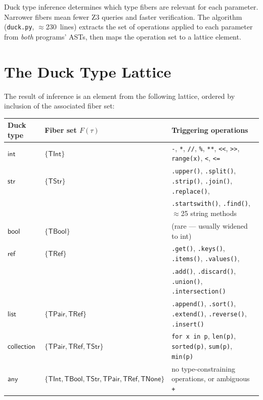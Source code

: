 \documentclass[11pt,a4paper]{report}
\theoremstyle{definition}
\theoremstyle{plain}
\begin{document}
Duck type inference determines which type fibers are relevant for
each parameter.  Narrower fibers mean fewer Z3 queries and faster
verification.  The algorithm (\texttt{duck.py}, $\approx$230~lines)
extracts the set of operations applied to each parameter from
\emph{both} programs' ASTs, then maps the operation set to a lattice
element.

\section{The Duck Type Lattice}

The result of inference is an element from the following lattice,
ordered by inclusion of the associated fiber set:

\begin{center}
\begin{tabular}{l l l}
  \textbf{Duck type} & \textbf{Fiber set $F(\tau)$} &
    \textbf{Triggering operations} \\
  \hline
  $\mathsf{int}$ & $\{\mathsf{TInt}\}$ &
    \texttt{-}, \texttt{*}, \texttt{//}, \texttt{\%},
    \texttt{**}, \texttt{<<}, \texttt{>>},
    \texttt{range(x)}, \texttt{<}, \texttt{<=} \\
  $\mathsf{str}$ & $\{\mathsf{TStr}\}$ &
    \texttt{.upper()}, \texttt{.split()}, \texttt{.strip()},
    \texttt{.join()}, \texttt{.replace()}, \\
  & & \texttt{.startswith()}, \texttt{.find()},
    $\approx$25 string methods \\
  $\mathsf{bool}$ & $\{\mathsf{TBool}\}$ &
    (rare --- usually widened to int) \\
  $\mathsf{ref}$ & $\{\mathsf{TRef}\}$ &
    \texttt{.get()}, \texttt{.keys()}, \texttt{.items()},
    \texttt{.values()}, \\
  & & \texttt{.add()}, \texttt{.discard()},
    \texttt{.union()}, \texttt{.intersection()} \\
  $\mathsf{list}$ & $\{\mathsf{TPair}, \mathsf{TRef}\}$ &
    \texttt{.append()}, \texttt{.sort()}, \texttt{.extend()},
    \texttt{.reverse()}, \texttt{.insert()} \\
  $\mathsf{collection}$ & $\{\mathsf{TPair}, \mathsf{TRef},
    \mathsf{TStr}\}$ &
    \texttt{for x in p}, \texttt{len(p)}, \texttt{sorted(p)},
    \texttt{sum(p)}, \texttt{min(p)} \\
  $\mathsf{any}$ & $\{\mathsf{TInt}, \mathsf{TBool},
    \mathsf{TStr}, \mathsf{TPair}, \mathsf{TRef},
    \mathsf{TNone}\}$ &
    no type-constraining operations, or ambiguous \texttt{+} \\
\end{tabular}
\end{center}
\end{document}
